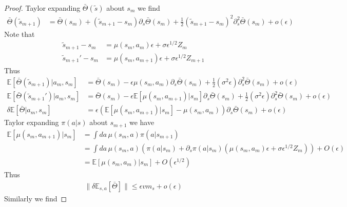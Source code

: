 \documentclass[10.5pt]{article}
\newcommand\bb{\mathbb}
\begin{document}
\begin{proof}
  Taylor expanding $\bar \Theta(\tilde s)$ about $s_m$ we find 
  \begin{align*}
    \bar \Theta(\tilde s_{m+1}) &= \bar \Theta(s_m) + (\tilde s_{m+1} - s_m)\partial_s \bar \Theta(s_m) + \tfrac{1}{2}(\tilde s_{m+1} - s_m)^2\partial^2_s \bar \Theta(s_m) + o(\epsilon)
  \end{align*}
  Note that
  \begin{align*}
    \tilde s_{m+1} - s_m &= \mu(s_m, a_m)\epsilon + \sigma\epsilon^{1/2} Z_m\\
    \tilde s_{m+1}' - s_m &= \mu(s_m, a_{m+1})\epsilon + \sigma\epsilon^{1/2} Z_{m+1}
  \end{align*}
  Thus
  \begin{align*}
    \bb E[\bar \Theta(\tilde s_{m+1})|a_m,s_m] &= \bar \Theta(s_m) - \epsilon \mu(s_m,a_m)\partial_s \bar \Theta(s_m) + \tfrac{1}{2}(\sigma^2 \epsilon) \partial^2_s \bar \Theta(s_m) + o(\epsilon)\\
    \bb E[\bar \Theta(\tilde s_{m+1}')|a_m,s_m] &= \bar \Theta(s_m) - \epsilon \bb E[\mu(s_m,a_{m+1})|s_m]\partial_s \bar \Theta(s_m) + \tfrac{1}{2}(\sigma^2 \epsilon) \partial^2_s \bar \Theta(s_m) + o(\epsilon)\\
    \delta \bb E[ \bar \Theta |a_m,s_m] &= \epsilon(\bb E[\mu(s_m,a_{m+1})|s_m]-\mu(s_m,a_m))\partial_s \bar \Theta(s_m) + o(\epsilon)
  \end{align*}
  Taylor expanding $\pi(a|s)$ about $s_{m+1}$ we have
  \begin{align*}
    \bb E[\mu(s_m,a_{m+1})|s_m] 
    &=  \int da\, \mu(s_m, a) \pi(a|s_{m+1})\\
    &=  \int da\, \mu(s_m, a) (\pi(a|s_m)+\partial_s \pi(a|s_m)(\mu(s_m,a_m)\epsilon + \sigma\epsilon^{1/2}Z_m)) + O(\epsilon)\\
    &= \bb E[\mu(s_m,a_m)|s_m] + O(\epsilon^{1/2})
  \end{align*}
  Thus
  \begin{align*}
    \|\delta \bb E_{s,a}[\bar \Theta]\| \leq \epsilon v m_s + o(\epsilon)
  \end{align*}
  Similarly we find

\end{proof}
\end{document}
